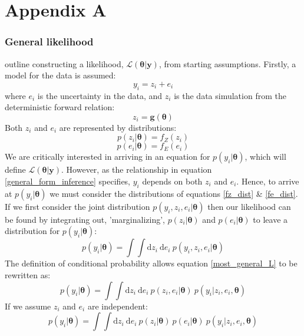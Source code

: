 \chapter{Appendix A}
\label{AppendixA}

\subsection{General likelihood}
\citet[p.90-92]{gregory2005bayesian} outline constructing a likelihood, $\mathcal{L}(\bm{\theta}|\bm{y})$, from starting assumptions. Firstly, a model for the data is assumed:
\begin{equation}
y_i = z_i + e_i
\label{general_form_inference}
\end{equation}
where $e_i$ is the uncertainty in the data, and $z_i$ is the data simulation from the deterministic forward relation:
\begin{equation}
z_i = \bm{g}(\bm{\theta})
\end{equation}
Both $z_i$ and $e_i$ are represented by distributions:
\begin{equation}
p(z_i|\bm{\theta}) = f_Z(z_i)
\label{fz_dist}
\end{equation}
\begin{equation}
p(e_i|\bm{\theta}) = f_E(e_i)
\label{fe_dist}
\end{equation}
We are critically interested in arriving in an equation for $p(y_i|\bm{\theta})$, which will define $\mathcal{L}(\bm{\theta}|\bm{y})$. However, as the relationship in equation \ref{general_form_inference} specifies, $y_i$ depends on both $z_i$ and $e_i$. Hence, to arrive at $p(y_i|\bm{\theta})$ we must consider the distributions of equations \ref{fz_dist} \& \ref{fe_dist}. If we first consider the joint distribution $p(y_i,z_i,e_i|\bm{\theta})$ then our likelihood can be found by integrating out, 'marginalizing', $p(z_i|\bm{\theta})$ and $p(e_i|\bm{\theta})$ to leave a distribution for $p(y_i|\bm{\theta})$:
\begin{equation}
p(y_i|\bm{\theta}) = \int \int \text{d}z_i\ \text{d}e_i\ p(y_i,z_i,e_i|\bm{\theta})
\label{most_general_L}
\end{equation}
The definition of conditional probability allows equation \ref{most_general_L} to be rewritten as:
\begin{equation}
p(y_i|\bm{\theta}) = \int \int \text{d}z_i\ \text{d}e_i\ p(z_i,e_i|\bm{\theta})\ p(y_i|z_i,e_i,\bm{\theta})
\end{equation}
If we assume $z_i$ and $e_i$ are independent:
\begin{equation}
p(y_i|\bm{\theta}) = \int \int \text{d}z_i\ \text{d}e_i\ p(z_i|\bm{\theta})\ p(e_i|\bm{\theta})\ p(y_i|z_i,e_i,\bm{\theta})
\label{halfway_through_derivation}
\end{equation}
